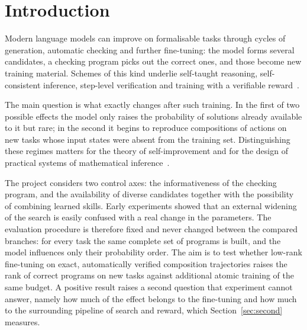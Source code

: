 \documentclass{zapiski}
\begin{document}
\maketitle

\section{Introduction}
\label{sec:intro}

Modern language models can improve on formalisable tasks through cycles of generation,
automatic checking and further fine-tuning: the model forms several candidates, a
checking program picks out the correct ones, and those become new training material.
Schemes of this kind underlie self-taught reasoning, self-consistent inference,
step-level verification and training with a verifiable
reward~\cite{gulcehre2023rest,lightman2024verify,wang2023selfconsistency,zelikman2022star}.

The main question is what exactly changes after such training. In the first of two
possible effects the model only raises the probability of solutions already available
to it but rare; in the second it begins to reproduce compositions of actions on new
tasks whose input states were absent from the training set. Distinguishing these
regimes matters for the theory of self-improvement and for the design of practical
systems of mathematical inference~\cite{liu2025prorl,yue2025rl}.

The project considers two control axes: the informativeness of the checking program,
and the availability of diverse candidates together with the possibility of combining
learned skills. Early experiments showed that an external widening of the search is
easily confused with a real change in the parameters. The evaluation procedure is
therefore fixed and never changed between the compared branches: for every task the
same complete set of programs is built, and the model influences only their probability
order. The aim is to test whether low-rank fine-tuning on exact, automatically verified
composition trajectories raises the rank of correct programs on new tasks against
additional atomic training of the same budget. A positive result raises a second
question that experiment cannot answer, namely how much of the effect belongs to the
fine-tuning and how much to the surrounding pipeline of search and reward, which
Section~\ref{sec:second} measures.
\end{document}
